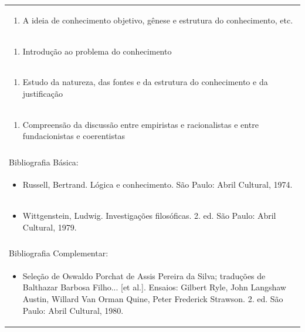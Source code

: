 \documentclass[11pt]{article}
\begin{document}
\begin{center}
\begin{longtable}{|p{4cm}|p{4cm}|p{4cm}|p{4cm}|}
\multicolumn{4}{|p{\dimexpr 16cm + 6\tabcolsep\relax}|}{\begin{enumerate}[start=2]\item A ideia de conhecimento objetivo, gênese e estrutura do conhecimento, etc.\end{enumerate}}\\
\multicolumn{4}{|p{\dimexpr 16cm + 6\tabcolsep\relax}|}{\begin{enumerate}[start=3]\item Introdução ao problema do conhecimento\end{enumerate}}\\
\multicolumn{4}{|p{\dimexpr 16cm + 6\tabcolsep\relax}|}{\begin{enumerate}[start=4]\item Estudo da natureza, das fontes e da estrutura do conhecimento e da justificação\end{enumerate}}\\
\multicolumn{4}{|p{\dimexpr 16cm + 6\tabcolsep\relax}|}{\begin{enumerate}[start=5]\item Compreensão da discussão entre empiristas e racionalistas e entre fundacionistas e coerentistas\end{enumerate}}\\
\multicolumn{4}{|p{\dimexpr 16cm + 6\tabcolsep\relax}|}{}\\
\hline
\multicolumn{4}{|p{16cm}|}{Bibliografia Básica:}\\*
\multicolumn{4}{|p{\dimexpr 16cm + 6\tabcolsep\relax}|}{\begin{itemize}\item Russell, Bertrand. Lógica e conhecimento. São Paulo: Abril Cultural, 1974.\end{itemize}}\\
\multicolumn{4}{|p{\dimexpr 16cm + 6\tabcolsep\relax}|}{\begin{itemize}\item Wittgenstein, Ludwig. Investigações filosóficas. 2. ed. São Paulo: Abril Cultural, 1979.\end{itemize}}\\
\multicolumn{4}{|p{16cm}|}{}\\
\hline
\multicolumn{4}{|p{16cm}|}{Bibliografia Complementar:}\\*
\multicolumn{4}{|p{\dimexpr 16cm + 6\tabcolsep\relax}|}{\begin{itemize}\item Seleção de Oswaldo Porchat de Assis Pereira da Silva; traduções de Balthazar Barbosa Filho... [et al.]. Ensaios: Gilbert Ryle, John Langshaw Austin, Willard Van Orman Quine, Peter Frederick Strawson. 2. ed. São Paulo: Abril Cultural, 1980.\end{itemize}}\\

\end{longtable}
\end{center}
\end{document}
